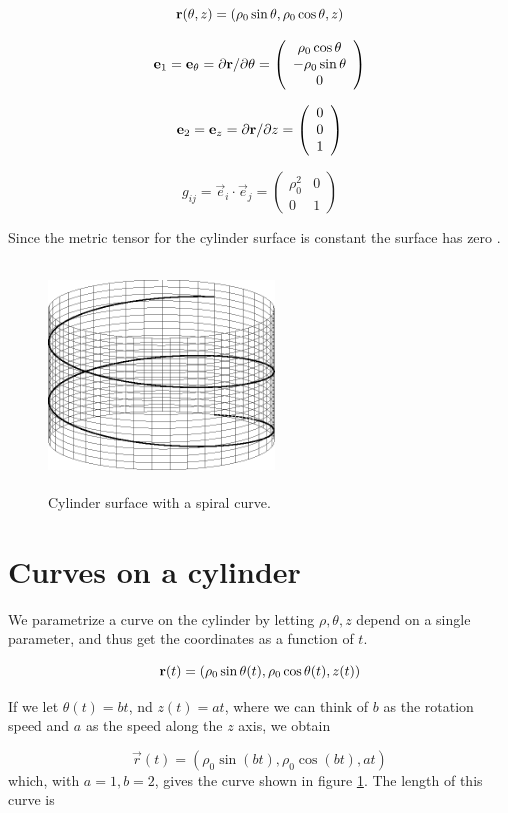 $$ \mathbf{r}(\theta,z) = (\rho_0\sin\theta, \rho_0\cos\theta, z) $$


$$ \mathbf{e}_1=\mathbf{e}_\theta =\partial\mathbf{r}/\partial\theta = \left( \begin{array}{ccc} \rho_0\cos\theta \\ -\rho_0\sin\theta \\ 0 \end{array} \right) $$

$$ \mathbf{e}_2=\mathbf{e}_z =\partial\mathbf{r}/\partial z = \left( \begin{array}{ccc} 0 \\ 0 \\ 1 \end{array} \right)
$$

$$
   g_{ij} =\vec{e}_i\cdot\vec{e}_j=  \left( \begin{array}{cc}
                    \rho_0^2 & 0 \\
                    0      & 1 
                    \end{array} 
             \right)
$$

Since the metric tensor for the cylinder surface is constant the surface has zero . 

\begin{figure}[!ht]
  \begin{center}
    \includegraphics[width=6cm,height=6cm]{figures/cyl}
  \end{center}

  \caption{\small Cylinder surface with a spiral curve.}
  \label{fig-cyl}
\end{figure}

\section{Curves on a cylinder}
We parametrize a curve on the cylinder by letting $\rho,\theta,z$ depend on a single parameter, and thus get the coordinates as a function of $t$.

$$ \mathbf{r}(t) = (\rho_0\sin\theta(t), \rho_0\cos\theta(t), z(t))$$

If we let $\theta(t)=bt$, nd $z(t)=at$, where we can think of $b$ as the rotation speed and $a$ as the speed along the $z$ axis, we obtain

$$ \vec{r}(t) = (\rho_0\sin(bt), \rho_0\cos(bt), at) $$ 
which, with $a=1, b=2$, gives the curve shown in figure \ref{fig-cyl}. The length of this curve is

